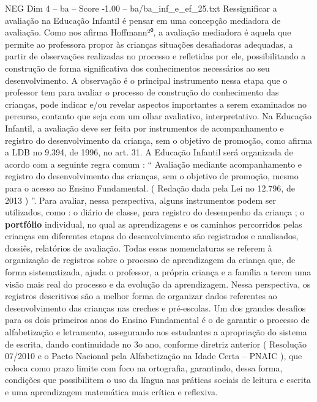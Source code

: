 \begin{textsample}{NEG Dim 4 – ba – Score -1.00 – ba/ba\_inf\_e\_ef\_25.txt}
Ressignificar a avaliação na Educação Infantil é pensar em uma concepção mediadora de avaliação.
Como nos afirma Hoffmann²⁰, a avaliação mediadora é aquela que permite ao professora propor às crianças situações desafiadoras adequadas, a partir de observações realizadas no processo e refletidas por ele, possibilitando a construção de forma significativa dos conhecimentos necessários ao seu desenvolvimento.
A observação é o principal instrumento nessa etapa que o professor tem para avaliar o processo de construção do conhecimento das crianças, pode indicar e/ou revelar aspectos importantes a serem examinados no percurso, contanto que seja com um olhar avaliativo, interpretativo.
Na Educação Infantil, a avaliação deve ser feita por instrumentos de acompanhamento e registro do desenvolvimento da criança, sem o objetivo de promoção, como afirma a LDB no 9.394, de 1996, no art. 31.
A Educação Infantil será organizada de acordo com a seguinte regra comum : “ Avaliação mediante acompanhamento e registro do desenvolvimento das crianças, sem o objetivo de promoção, mesmo para o acesso ao Ensino Fundamental. ( Redação dada pela Lei no 12.796, de 2013 ) ”.
Para avaliar, nessa perspectiva, alguns instrumentos podem ser utilizados, como : o diário de classe, para registro do desempenho da criança ; o \textbf{portfólio} individual, no qual as aprendizagens e os caminhos percorridos pelas crianças em diferentes etapas do desenvolvimento são registrados e analisados, dossiês, relatórios de avaliação.
Todas essas nomenclaturas se referem à organização de registros sobre o processo de aprendizagem da criança que, de forma sistematizada, ajuda o professor, a própria criança e a família a terem uma visão mais real do processo e da evolução da aprendizagem.
Nessa perspectiva, os registros descritivos são a melhor forma de organizar dados referentes ao desenvolvimento das crianças nas creches e pré-escolas.
Um dos grandes desafios para os dois primeiros anos do Ensino Fundamental é o de garantir o processo de alfabetização e letramento, assegurando aos estudantes a apropriação do sistema de escrita, dando continuidade no 3o ano, conforme diretriz anterior ( Resolução 07/2010 e o Pacto Nacional pela Alfabetização na Idade Certa – PNAIC ), que coloca como prazo limite com foco na ortografia, garantindo, dessa forma, condições que possibilitem o uso da língua nas práticas sociais de leitura e escrita e uma aprendizagem matemática mais crítica e reflexiva.

\end{textsample}
